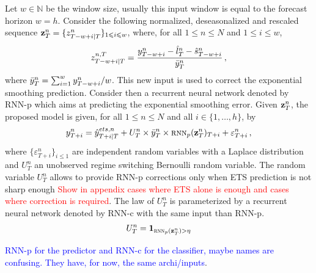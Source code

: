 \documentclass{article} %
\newcommand{\ts}{y}
\newcommand{\tspred}{\hat{\ts}}
\newcommand{\lvl}{\hat{l}}
\newcommand{\seas}{\hat{s}}
\newcommand{\lag}{h}
\newcommand{\window}{w}
\newcommand{\etspred}{\hat{y}}
\newcommand{\meants}{\Bar{\ts}}
\newcommand{\rnnwindow}{{\bf \rnn}}
\newcommand{\rnn}{z}
\newcommand{\err}{err}
\newcommand{\rnnmodel}{\textsc{rnn}}
\newcommand{\threshold}{\eta}
\begin{document}
Let $\window \in \mathbb{N}$ be the window size, usually this input window is equal to the forecast horizon $\window = \lag$. Consider the following  normalized, deseasonalized and rescaled sequence $\rnnwindow^n_T = \{\rnn^{n}_{T-\window+i|T}\}_{1\leqslant i \leqslant w}$, where, for all $1\leqslant n \leqslant N$ and $1\leqslant i \leqslant w$, 
$$
\rnn^{n,T}_{T-w+i|T} = \frac{\ts^n_{T-w+i} - \lvl^n_T - \seas^n_{T-w+i}}{\meants^n_T}\,,
$$
where $ \meants^n_T = \sum_{i = 1}^{w}  \ts^n_{T-w+i}/w$. This new input is used to correct the exponential smoothing prediction. %
Consider then a recurrent neural network denoted by RNN-p which aims at predicting the exponential smoothing error. Given $\rnnwindow^n_T$, the proposed model is given, for all $1\leqslant n \leqslant N$ and all $i \in \{1,\ldots,\lag\}$, by
$$
\ts^n_{T+i}  = \etspred^{ets,n}_{T+i|T} +  U^n_T\times\meants^n_T\times \rnnmodel_p(\rnnwindow^n_T)_{T+i} + \varepsilon^n_{T+i}\,,%
$$
where $\{\varepsilon^n_{T+i}\}_{i\leqslant 1}$ are independent random variables with a Laplace distribution and $U^n_T$ an unobserved regime switching Bernoulli random variable. The random variable $U^n_T$ allows to provide RNN-p corrections only when ETS prediction is not sharp enough \textcolor{red}{Show in appendix cases where ETS alone is enough and cases where correction is required}. The law of $U^n_T$ is parameterized by a recurrent neural network denoted by RNN-c with the same input than RNN-p.
\begin{align*}
U^n_T = \mathbf{1}_{\rnnmodel_p(\rnnwindow^n_T) > \threshold}
\end{align*}

\textcolor{blue}{RNN-p for the predictor and RNN-c for the classifier, maybe names are confusing. They have, for now, the same archi/inputs}.
\end{document}
